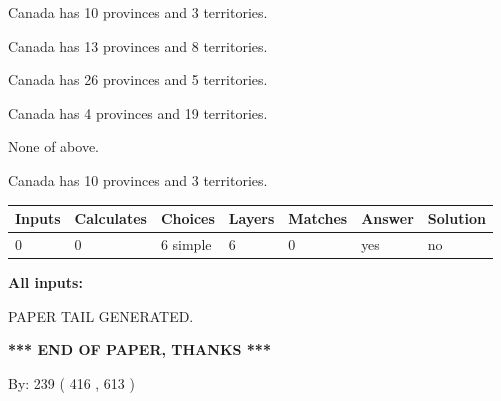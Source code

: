 \documentclass[12pt]{article}
\begin{document}
 
Canada has 10  provinces and 3 territories.
 
 
Canada has  13 provinces and  8 territories.
 
 
Canada has  26 provinces and  5 territories.
 
 
Canada has   4 provinces and  19 territories.
 
 
 None of above.
 
 
\noindent{}
 
 
Canada has 10  provinces and 3 territories.
 
 
\noindent{}
 
 
   
   
   
   
\noindent\begin{tabular}{|l|l|l|l|l|l|l|}
 \hline
Inputs & Calculates & Choices & Layers & Matches & Answer & Solution \\ \hline
 0  & 
 0  & 
 6
  simple  
  & 
 6  & 
 0  & 
  yes & 
  no 
  \\ \hline
 \end{tabular}
   
   
   
   
\noindent{}
   
   
   
   
\noindent\vspace{0.1in}\hspace{-0.08in} {\textbf{\Large{All inputs: }}}
   
   
   
   
   
   
 \vspace{0.2in}
 
   
   
\vspace{2.0in} PAPER TAIL GENERATED.
   
   
   
   
\vspace{1.0in} 
{\textbf{\large{ *** END OF PAPER, THANKS *** }}} 
   
   
\hspace{1.0in} By: 
 239 ( 416 ,  613 )
   
\end{document}
